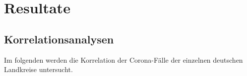 \chapter{Resultate}\label{chap:Durchführung}
\section{Korrelationsanalysen}
Im folgenden werden die Korrelation der Corona-Fälle der einzelnen deutschen Landkreise untersucht.
%




